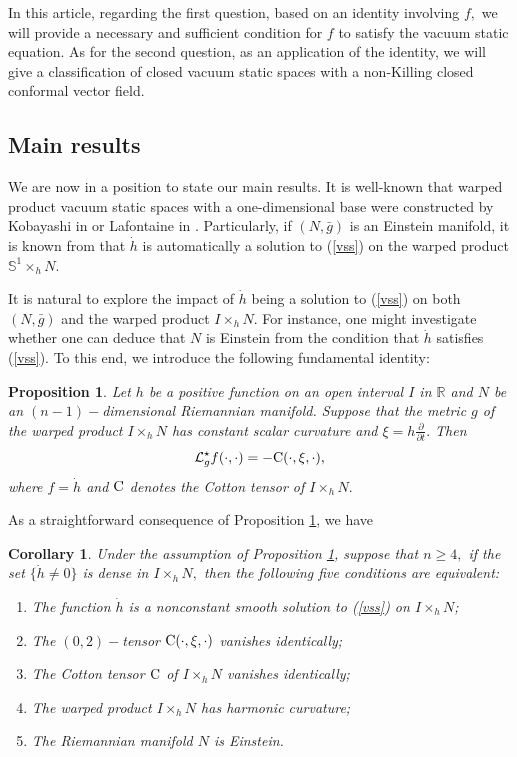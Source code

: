 \documentclass[10pt,leqno,oneside]{amsart}
\newtheorem{Prop}{Proposition}
\newtheorem{Cor}{Corollary}
\begin{document}
          In this article, regarding the first question, based on an identity involving $f,$ we will provide a necessary and sufficient condition for \(f\) to satisfy the vacuum static equation. As for the second question, as an application of the identity, we will give a classification of closed vacuum static spaces with a non-Killing closed conformal vector field.
   \subsection{Main results}
          We are now in a position to state our main results. It is well-known that warped product vacuum static spaces with a one-dimensional base were constructed by Kobayashi in \cite{Kobayashi1982} or Lafontaine in \cite{Lafontaine1983}. Particularly, if $(N , \bar{g})$ is an Einstein manifold, it is known from \cite[Lemma C3]{Lafontaine1983} that $\dot{h}$ is automatically a solution to (\ref{vss}) on the warped product $\mathbb{S}^1\times_h N.$

          It is natural to explore the impact of \(\dot{h}\) being a solution to (\ref{vss}) on both \((N ,\bar{g})\) and the warped product \(I\times_h N \). For instance, one might investigate whether one can deduce that $N$ is Einstein from the condition that $\dot{h}$ satisfies (\ref{vss}). To this end, we introduce the following fundamental identity:
    \begin{Prop}\label{warpedproduct}
        Let $h$ be a positive function on an open interval $I$ in $\mathbb{R}$ and $N$ be an $(n-1)-$dimensional Riemannian manifold. Suppose that the metric $g$ of the warped product $I\times_hN$ has constant scalar curvature and $\xi=h\frac{\partial}{\partial t}.$ Then
        $$\mathcal{L}_g^{\star}f(\cdot,\cdot)=-\rm{C}(\cdot,\xi,\cdot),$$
        where $f=\dot{h}$ and $\rm{C}$ denotes the Cotton tensor of $I\times_hN.$
    \end{Prop}

         As a straightforward consequence of Proposition \ref{warpedproduct}, we have

    \begin{Cor} Under the assumption of Proposition {\rm\ref{warpedproduct}}, suppose that $n\geq4,$ if the set $\{\dot{h}\neq0\}$ is dense in $I\times_hN,$ then the following five conditions are equivalent:
        \begin{enumerate}[leftmargin=0.6cm, itemindent=0.4cm]
          \item[(i).] The function $\dot{h}$ is a nonconstant smooth solution to {\rm(\ref{vss})} on $I\times_hN$;
          \item[(ii).] The $(0,2)-$tensor $\rm{C}(\cdot,\xi,\cdot)$ vanishes identically;
           \item[(iii).] The Cotton tensor $\rm{C}$ of $I\times_hN$ vanishes identically;
          \item[(iv).] The warped product $I\times_hN$ has harmonic curvature;
          \item[(v).] The Riemannian manifold $N$ is Einstein.
        \end{enumerate}
    \end{Cor}
\end{document}
